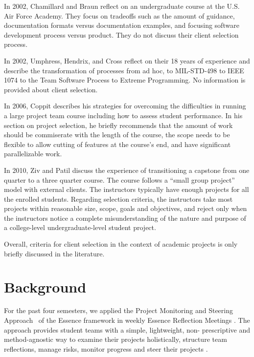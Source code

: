 \documentclass[conference]{IEEEtran}
\begin{document}
In 2002, Chamillard and Braun \cite{Chamillard2002} reflect on an undergraduate course at the U.S. Air Force Academy. They focus on tradeoffs such as the amount of guidance, documentation formats versus documentation examples, and focusing software development process versus product. They do not discuss their client selection process.

In 2002, Umphress, Hendrix, and Cross \cite{Umphress2002} reflect on their 18 years of experience and describe the transformation of processes from ad hoc, to MIL-STD-498 to IEEE 1074 to the Team Software Process to Extreme Programming. No information is provided about client selection.

In 2006, Coppit \cite{coppit2006} describes his strategies for overcoming the difficulties in running a large project team course including how to assess student performance. In his section on project selection, he briefly recommends that the amount of work should be commiserate with the length of the course, the scope needs to be flexible to allow cutting of features at the course's end, and have significant parallelizable work. 

In 2010, Ziv and Patil \cite {ziv2010capstone} discuss the experience of transitioning a capstone from one quarter to a three quarter course. The course follows a ``small group project'' model with external clients. The instructors typically have enough projects for all the enrolled students. Regarding selection criteria, the instructors take most projects within reasonable size, scope, goals and objectives, and reject only when the instructors notice a complete misunderstanding of the nature and purpose of a college-level undergraduate-level student project. 

Overall, criteria for client selection in the context of academic projects is only briefly discussed in the literature. 

\section{Background}
\label{Background}
For the past four semesters, we applied the Project Monitoring and
Steering Approach ~of the Essence framework
\cite{EssenceBook} in weekly Essence Reflection
Meetings \cite{EASE2014}. The approach provides student
teams with a simple, lightweight, non- prescriptive and method-agnostic
way to examine their projects holistically, structure team reflections,
manage risks, monitor progress and steer their projects
\cite{ICSE2014}.
\end{document}

